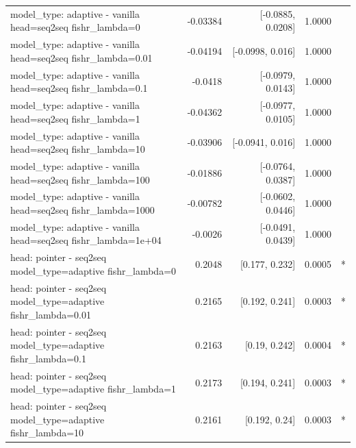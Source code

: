 \documentclass[10pt]{article}
\makeatletter
\newcommand{\stackcell}[1]{\begin{tabular}[t]{@{}l@{}}#1\end{tabular}}
\makeatother
\begin{document}
{\begin{longtable}{lrrrl}
\stackcell{model\_type: adaptive - vanilla\\\footnotesize head=seq2seq fishr\_lambda=0 } & -0.03384 & [-0.0885, 0.0208] & 1.0000 & \\
\stackcell{model\_type: adaptive - vanilla\\\footnotesize head=seq2seq fishr\_lambda=0.01 } & -0.04194 & [-0.0998, 0.016] & 1.0000 & \\
\stackcell{model\_type: adaptive - vanilla\\\footnotesize head=seq2seq fishr\_lambda=0.1 } & -0.0418 & [-0.0979, 0.0143] & 1.0000 & \\
\stackcell{model\_type: adaptive - vanilla\\\footnotesize head=seq2seq fishr\_lambda=1 } & -0.04362 & [-0.0977, 0.0105] & 1.0000 & \\
\stackcell{model\_type: adaptive - vanilla\\\footnotesize head=seq2seq fishr\_lambda=10 } & -0.03906 & [-0.0941, 0.016] & 1.0000 & \\
\stackcell{model\_type: adaptive - vanilla\\\footnotesize head=seq2seq fishr\_lambda=100 } & -0.01886 & [-0.0764, 0.0387] & 1.0000 & \\
\stackcell{model\_type: adaptive - vanilla\\\footnotesize head=seq2seq fishr\_lambda=1000 } & -0.00782 & [-0.0602, 0.0446] & 1.0000 & \\
\stackcell{model\_type: adaptive - vanilla\\\footnotesize head=seq2seq fishr\_lambda=1e+04 } & -0.0026 & [-0.0491, 0.0439] & 1.0000 & \\
\stackcell{head: pointer - seq2seq\\\footnotesize model\_type=adaptive fishr\_lambda=0 } & 0.2048 & [0.177, 0.232] & 0.0005 & *\\
\stackcell{head: pointer - seq2seq\\\footnotesize model\_type=adaptive fishr\_lambda=0.01 } & 0.2165 & [0.192, 0.241] & 0.0003 & *\\
\stackcell{head: pointer - seq2seq\\\footnotesize model\_type=adaptive fishr\_lambda=0.1 } & 0.2163 & [0.19, 0.242] & 0.0004 & *\\
\stackcell{head: pointer - seq2seq\\\footnotesize model\_type=adaptive fishr\_lambda=1 } & 0.2173 & [0.194, 0.241] & 0.0003 & *\\
\stackcell{head: pointer - seq2seq\\\footnotesize model\_type=adaptive fishr\_lambda=10 } & 0.2161 & [0.192, 0.24] & 0.0003 & *\\

\end{longtable}}
\end{document}
